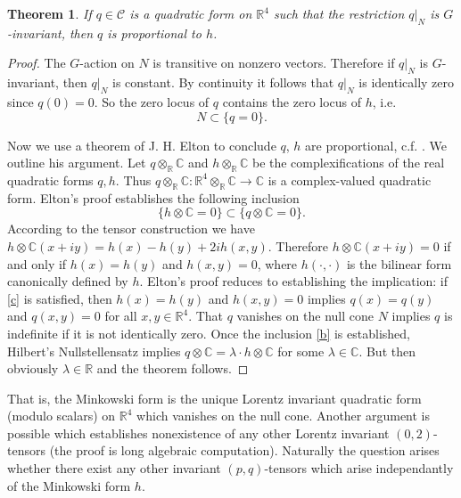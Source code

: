 \documentclass[12pt]{amsart}
\newtheorem*{thm}{Theorem}
\theoremstyle{definition}
\theoremstyle{remark}
\newcommand{\bC}{\mathbb{C}}
\newcommand{\bR}{\mathbb{R}}
\newcommand{\sC}{\mathscr{C}}
\begin{document}
\begin{thm}
If $q\in \sC$ is a quadratic form on $\bR^4$ such that the restriction $q|_N$ is $G$-invariant, then $q$ is proportional to $h$. 
\end{thm} 
\begin{proof}
The $G$-action on $N$ is transitive on nonzero vectors. Therefore if $q|_N$ is $G$-invariant, then $q|_N$ is constant. By continuity it follows that $q|_N$ is identically zero since $q(0)=0$. So the zero locus of $q$ contains the zero locus of $h$, i.e. \begin{equation}\label{c} N\subset \{q=0\}.
\end{equation}

Now we use a theorem of J. H. Elton to conclude $q$, $h$ are proportional, c.f. \cite{elton2010indefinite}. We outline his argument. Let $q\otimes_\bR \bC$ and $h\otimes_\bR \bC$ be the complexifications of the real quadratic forms $q,h$. Thus $q\otimes_\bR \bC: \bR^4 \otimes_\bR \bC \to \bC$ is a complex-valued quadratic form. Elton's proof establishes the following inclusion \begin{equation}\label{b}
\{h\otimes \bC=0\} \subset \{q\otimes \bC=0\}.
\end{equation}
According to the tensor construction we have $h\otimes \bC (x+iy)=h(x)-h(y) + 2i h(x,y)$. Therefore $h\otimes \bC(x+iy)=0$ if and only if $h(x)=h(y)$ and $h(x,y)=0$, where $h(\cdot, \cdot)$ is the bilinear form canonically defined by $h$. Elton's proof reduces to establishing the implication: if \eqref{c} is satisfied, then $h(x)=h(y)$ and $h(x,y)=0$ implies $q(x)=q(y)$ and $q(x,y)=0$ for all $x,y\in \bR^4$. That $q$ vanishes on the null cone $N$ implies $q$  is indefinite if it is not identically zero. Once the inclusion \eqref{b} is established, Hilbert's Nullstellensatz \cite{eisenbud2013commutative} implies $q\otimes \bC=\lambda \cdot h\otimes \bC$ for some $\lambda \in \bC$. But then obviously $\lambda\in \bR$ and the theorem follows.
\end{proof}

That is, the Minkowski form is the unique Lorentz invariant quadratic form (modulo scalars) on $\bR^4$ which vanishes on the null cone. Another argument is possible \cite{arminjon2018lorentz} which establishes nonexistence of any other Lorentz invariant $(0,2)$-tensors (the proof is long algebraic computation). Naturally the question arises whether there exist any other invariant $(p,q)$-tensors which arise independantly of the Minkowski form $h$.  
\end{document}
